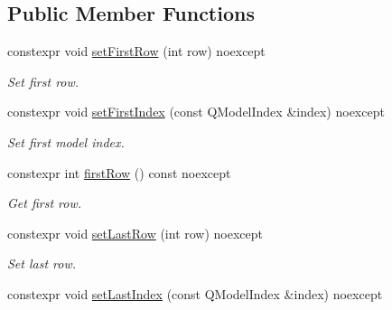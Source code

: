 \subsection*{Public Member Functions}
\begin{DoxyCompactItemize}
\item 
constexpr void \hyperlink{class_mdt_1_1_item_model_1_1_row_range_a018c6882ab0e6fab38c6cb39e1ba1a17}{set\+First\+Row} (int row) noexcept\hypertarget{class_mdt_1_1_item_model_1_1_row_range_a018c6882ab0e6fab38c6cb39e1ba1a17}{}\label{class_mdt_1_1_item_model_1_1_row_range_a018c6882ab0e6fab38c6cb39e1ba1a17}

\begin{DoxyCompactList}\small\item\em Set first row. \end{DoxyCompactList}\item 
constexpr void \hyperlink{class_mdt_1_1_item_model_1_1_row_range_a026fc8361da97fd52bc903a33bf4328c}{set\+First\+Index} (const Q\+Model\+Index \&index) noexcept\hypertarget{class_mdt_1_1_item_model_1_1_row_range_a026fc8361da97fd52bc903a33bf4328c}{}\label{class_mdt_1_1_item_model_1_1_row_range_a026fc8361da97fd52bc903a33bf4328c}

\begin{DoxyCompactList}\small\item\em Set first model index. \end{DoxyCompactList}\item 
constexpr int \hyperlink{class_mdt_1_1_item_model_1_1_row_range_ac0cde24a15dc370e58613e1fe03ce608}{first\+Row} () const noexcept
\begin{DoxyCompactList}\small\item\em Get first row. \end{DoxyCompactList}\item 
constexpr void \hyperlink{class_mdt_1_1_item_model_1_1_row_range_a5cbe6baacc5f0800d2ec27b038d46cdd}{set\+Last\+Row} (int row) noexcept\hypertarget{class_mdt_1_1_item_model_1_1_row_range_a5cbe6baacc5f0800d2ec27b038d46cdd}{}\label{class_mdt_1_1_item_model_1_1_row_range_a5cbe6baacc5f0800d2ec27b038d46cdd}

\begin{DoxyCompactList}\small\item\em Set last row. \end{DoxyCompactList}\item 
constexpr void \hyperlink{class_mdt_1_1_item_model_1_1_row_range_aa11efe15e9d4586d8f6c6079b9eed749}{set\+Last\+Index} (const Q\+Model\+Index \&index) noexcept\hypertarget{class_mdt_1_1_item_model_1_1_row_range_aa11efe15e9d4586d8f6c6079b9eed749}{}\label{class_mdt_1_1_item_model_1_1_row_range_aa11efe15e9d4586d8f6c6079b9eed749}


\end{DoxyCompactItemize}
